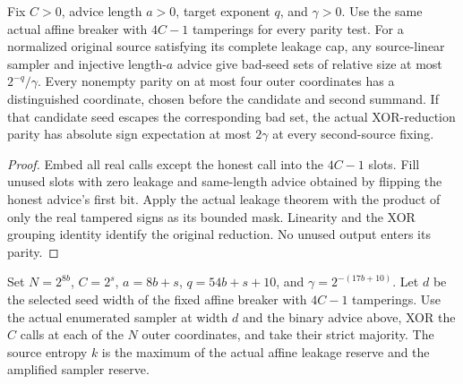 \begin{theorem}
  \label{thm:lowerbounds-algebraic-fixed-affine-tests}
  \leanok
  Fix $C>0$, advice length $a>0$, target exponent $q$, and
  $\gamma>0$. Use the same actual affine breaker with $4C-1$
  tamperings for every parity test. For a normalized original source
  satisfying its complete leakage cap, any source-linear sampler and
  injective length-$a$ advice give bad-seed sets of relative size at
  most $2^{-q}/\gamma$. Every nonempty parity on at most four outer
  coordinates has a distinguished coordinate, chosen before the
  candidate and second summand. If that candidate seed escapes the
  corresponding bad set, the actual XOR-reduction parity has absolute
  sign expectation at most $2\gamma$ at every second-source fixing.
\end{theorem}
\begin{proof}
  \leanok
  Embed all real calls except the honest call into the $4C-1$ slots.
  Fill unused slots with zero leakage and same-length advice obtained
  by flipping the honest advice's first bit. Apply the actual leakage
  theorem with the product of only the real tampered signs as its
  bounded mask. Linearity and the XOR grouping identity identify the
  original reduction. No unused output enters its parity.
\end{proof}

\begin{definition}
  \label{def:lowerbounds-algebraic-finite-sumset-construction}
  \leanok
  Set $N=2^{8b}$, $C=2^s$, $a=8b+s$, $q=54b+s+10$, and
  $\gamma=2^{-(17b+10)}$. Let $d$ be the selected seed width of the
  fixed affine breaker with $4C-1$ tamperings. Use the actual enumerated
  sampler at width $d$ and the binary advice above, XOR the $C$ calls
  at each of the $N$ outer coordinates, and take their strict majority.
  The source entropy $k$ is the maximum of the actual affine leakage
  reserve and the amplified sampler reserve.
\end{definition}

